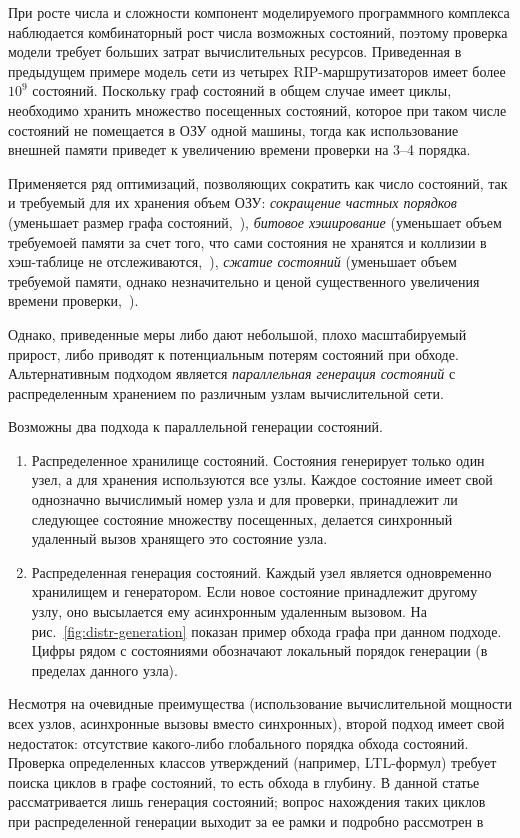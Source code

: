 \documentclass[12pt,a4paper,fleqn]{article}
\begin{document}
При росте числа и сложности компонент моделируемого программного комплекса наблюдается комбинаторный рост числа
возможных состояний, поэтому проверка модели требует больших затрат вычислительных ресурсов. Приведенная в предыдущем
примере модель сети из четырех RIP-маршрутизаторов имеет более $10^9$ состояний. Поскольку граф состояний в общем случае
имеет циклы, необходимо хранить множество посещенных состояний, которое при таком числе состояний не помещается в ОЗУ
одной машины, тогда как использование внешней памяти приведет к увеличению времени проверки на 3--4 порядка.

Применяется ряд оптимизаций, позволяющих сократить как число состояний, так и требуемый для их хранения объем ОЗУ:
\emph{сокращение частных порядков} (уменьшает размер графа состояний,~\cite{POD}), \emph{битовое хэширование} (уменьшает
объем требуемоей памяти за счет того, что сами состояния не хранятся и коллизии в хэш-таблице не
отслеживаются,~\cite{BitHash1, Wolper}), \emph{сжатие состояний} (уменьшает объем требуемой памяти, однако незначительно
и ценой существенного увеличения времени проверки,~\cite{StateCompr}). 

Однако, приведенные меры либо дают небольшой, плохо масштабируемый прирост, либо приводят к потенциальным потерям
состояний при обходе. Альтернативным подходом является \emph{параллельная генерация состояний} с распределенным
хранением по различным узлам вычислительной сети.

Возможны два подхода к параллельной генерации состояний.

\begin{enumerate}
\item Распределенное хранилище состояний. Состояния генерирует только один узел, а для хранения используются все
  узлы. Каждое состояние имеет свой однозначно вычислимый номер узла и для проверки, принадлежит ли следующее состояние
  множеству посещенных, делается синхронный удаленный вызов хранящего это состояние узла.

\item Распределенная генерация состояний. Каждый узел является одновременно хранилищем и генератором. Если новое
  состояние принадлежит другому узлу, оно высылается ему асинхронным удаленным вызовом. На
  рис.~\ref{fig:distr-generation} показан пример обхода графа при данном подходе. Цифры рядом с состояниями обозначают
  локальный порядок генерации (в пределах данного узла).
\end{enumerate}

Несмотря на очевидные преимущества (использование вычислительной мощности всех узлов, асинхронные вызовы вместо
синхронных), второй подход имеет свой недостаток: отсутствие какого-либо глобального порядка обхода состояний. Проверка
определенных классов утверждений (например, LTL-формул) требует поиска циклов в графе состояний, то есть обхода в
глубину. В данной статье рассматривается лишь генерация состояний; вопрос нахождения таких циклов при распределенной
генерации выходит за ее рамки и подробно рассмотрен в~\cite{DLTL1,DLTL2}
\end{document}
